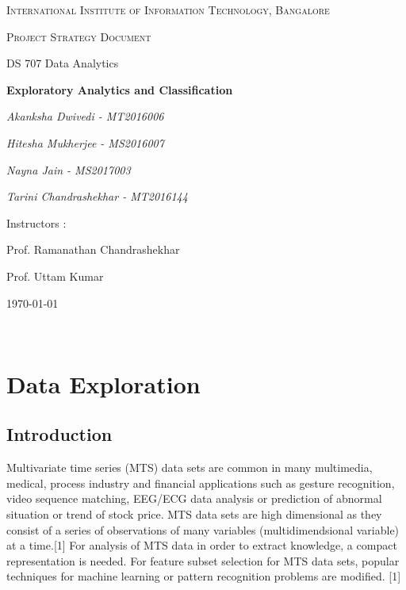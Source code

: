 \documentclass{article}
\begin{document}
\begin{titlepage}
	\centering
	{\scshape\LARGE International Institute of Information Technology, Bangalore \par}
	\vspace{1cm}
	{\scshape\Large Project Strategy Document\par}
	{\Large  DS 707 Data Analytics\par}
	\vspace{1.5cm}
	{\huge\bfseries Exploratory Analytics and Classification \par}
	\vspace{2cm}
	{\Large\itshape Akanksha Dwivedi - MT2016006\par}
	{\Large\itshape Hitesha Mukherjee - MS2016007\par}
	{\Large\itshape Nayna Jain - MS2017003\par}
	{\Large\itshape Tarini Chandrashekhar - MT2016144\par}
	\vfill
	Instructors : \par
	Prof. Ramanathan Chandrashekhar
	\par
	Prof. Uttam Kumar

	\vfill
	{\large \today\par}
\end{titlepage}

\newpage

\tableofcontents

\newpage
\justify

\

\section{Data Exploration}

\subsection {Introduction}
Multivariate time series (MTS) data sets are common in many multimedia, medical, process industry and financial applications such as gesture recognition, video sequence matching, EEG/ECG data analysis or prediction of abnormal situation or trend of stock price. MTS data sets are high dimensional as they consist of a series of observations of many variables (multidimendsional variable) at a time.[1]
For analysis of MTS data in order to extract knowledge, a compact representation is needed. For feature subset selection for MTS data sets, popular techniques for machine learning or pattern recognition problems are modified. [1] \newline
\end{document}
